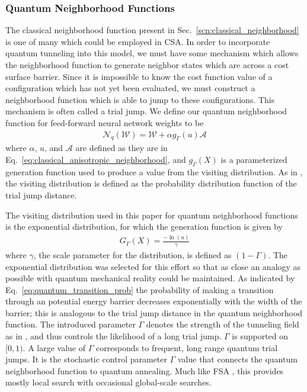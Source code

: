 \documentclass[10pt,journal,cspaper,compsoc]{IEEEtran}
\begin{document}
\subsubsection{Quantum Neighborhood Functions}
\label{scn:quantum_neighborhood}

The classical neighborhood function present in Sec.~\ref{scn:classical_neighborhood} is one of many which could be employed in CSA. In order to incorporate quantum tunneling into this model, we must have some mechanism which allows the neighborhood function to generate neighbor states which are across a cost surface barrier. Since it is impossible to know the cost function value of a configuration which has not yet been evaluated, we must construct a neighborhood function which is able to jump to these configurations. This mechanism is often called a trial jump. We define our quantum neighborhood function for feed-forward neural network weights to be
\begin{align}\label{eq:quantum_anisotropic_neighborhood}
\mathcal{N}_{q} (\boldsymbol{\mathcal{W}}) = \boldsymbol{\mathcal{W}} + \alpha g_{\Gamma}(u) \boldsymbol{\mathcal{A}} 
\end{align}
\noindent where $\alpha$, $u$, and $\boldsymbol{\mathcal{A}}$ are defined as they are in Eq.~\ref{eq:classical_anisotropic_neighborhood}, and $g_{\Gamma}(X)$ is a parameterized generation function used to produce a value from the visiting distribution. As in \cite{tsallis1996generalizedsimulatedannealing}, the visiting distribution is defined as the probability distribution function of the trial jump distance. 

The visiting distribution used in this paper for quantum neighborhood functions is the exponential distribution, for which the generation function is given by
\begin{align}\label{eq:exp_generation_fcn}
G_{\Gamma}(X) =  \frac{-\ln(u)}{\gamma}
\end{align}
\noindent where $\gamma$, the scale parameter for the distribution, is defined as $(1-\Gamma)$. The exponential distribution was selected for this effort so that as close an analogy as possible with quantum mechanical reality could be maintained. As indicated by Eq.~\ref{eq:quantum_transition_prob} the probability of making a transition through an potential energy barrier decreases exponentially with the width of the barrier; this is analogous to the trial jump distance in the quantum neighborhood function. The introduced parameter $\Gamma$ denotes the strength of the tunneling field as in \cite{mukherjee2015multivariatesearchqa}, and thus controls the likelihood of a long trial jump. $\Gamma$ is supported on $[0,1)$. A large value of $\Gamma$ corresponds to frequent, long range quantum trial jumps. It is the stochastic control parameter $\Gamma$ value that connects the quantum neighborhood function to quantum annealing. Much like FSA \cite{szu1987fastsimulatedannealing}, this provides mostly local search with occasional global-scale searches. 
\end{document}
